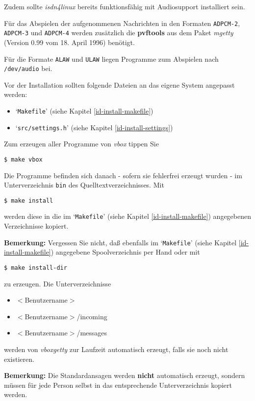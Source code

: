 Zudem sollte {\em isdn4linux\/} bereits funktionsf\"{a}hig mit Audiosupport
installiert sein.

F\"{u}r das Abspielen der aufgenommenen Nachrichten in den Formaten
{\tt ADPCM-2}, {\tt ADPCM-3} und {\tt ADPCM-4} werden zus\"{a}tzlich
die {\bf pvftools} aus dem Paket {\em mgetty\/} (Version 0.99 vom 18.
April 1996) ben\"{o}tigt.

F\"{u}r die Formate {\tt ALAW} und {\tt ULAW} liegen Programme zum
Abspielen nach {\tt /dev/audio} bei.

Vor der Installation sollten folgende Dateien an das eigene System angepasst
werden:

\begin{itemize}
\item `{\tt Makefile}' (siehe Kapitel \ref{id-install-makefile})
\item `{\tt src/settings.h}' (siehe Kapitel \ref{id-install-settings})
\end{itemize}


Zum erzeugen aller Programme von {\em vbox\/} tippen Sie

{\tt \$ make vbox}

Die Programme befinden sich danach - sofern sie fehlerfrei erzeugt wurden -
im Unterverzeichnis {\tt bin} des Quelltextverzeichnisses. Mit

{\tt \$ make install}

werden diese in die im `{\tt Makefile}' (siehe Kapitel \ref{id-install-makefile}) angegebenen
Verzeichnisse kopiert.

{\bf Bemerkung:} Vergessen Sie nicht, da{\ss} ebenfalls im
`{\tt Makefile}' (siehe Kapitel \ref{id-install-makefile}) angegebene Spoolverzeichnis per Hand
oder mit

{\tt \$ make install-dir}

zu erzeugen. Die Unterverzeichnisse

\begin{itemize}
\item {\(<\)}Benutzername{\(>\)}
\item {\(<\)}Benutzername{\(>\)}/incoming
\item {\(<\)}Benutzername{\(>\)}/messages
\end{itemize}


werden von {\em vboxgetty\/} zur Laufzeit automatisch erzeugt, falls sie
noch nicht existieren.

{\bf Bemerkung:} Die Standardansagen werden {\bf nicht} automatisch
erzeugt, sondern m\"{u}ssen f\"{u}r jede Person selbst in das entsprechende
Unterverzeichnis kopiert werden.






